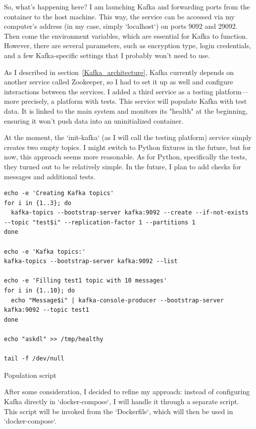 \documentclass[10pt , a4paper]{report}
\newenvironment{code}{\captionsetup{type=listing}}{}
\begin{document}
So, what's happening here? I am launching Kafka and forwarding ports from the container to the host machine. This way, the service can be accessed via my computer's address (in my case, simply `localhost`) on ports 9092 and 29092. Then come the environment variables, which are essential for Kafka to function. However, there are several parameters, such as encryption type, login credentials, and a few Kafka-specific settings that I probably won’t need to use.

As I described in section~\ref{Kafka_architecture}, Kafka currently depends on another service called Zookeeper, so I had to set it up as well and configure interactions between the services. I added a third service as a testing platform—more precisely, a platform with tests. This service will populate Kafka with test data. It is linked to the main system and monitors its "health" at the beginning, ensuring it won't push data into an uninitialized container.

At the moment, the `init-kafka` (as I will call the testing platform) service simply creates two empty topics. I might switch to Python fixtures in the future, but for now, this approach seems more reasonable. As for Python, specifically the tests, they turned out to be relatively simple. In the future, I plan to add checks for messages and additional tests.

\begin{code}
  \begin{verbatim}
echo -e 'Creating Kafka topics'
for i in {1..3}; do
  kafka-topics --bootstrap-server kafka:9092 --create --if-not-exists --topic "test$i" --replication-factor 1 --partitions 1
done

echo -e 'Kafka topics:'
kafka-topics --bootstrap-server kafka:9092 --list

echo -e 'Filling test1 topic with 10 messages'
for i in {1..10}; do
  echo "Message$i" | kafka-console-producer --bootstrap-server kafka:9092 --topic test1
done

echo "askdl" >> /tmp/healthy

tail -f /dev/null

  \end{verbatim}
  \caption{Population script}
\end{code}

After some consideration, I decided to refine my approach: instead of configuring Kafka directly in `docker-compose`, I will handle it through a separate script. This script will be invoked from the `Dockerfile`, which will then be used in `docker-compose`. 
\end{document}

